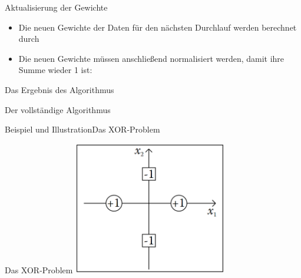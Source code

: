 \documentclass[hyperref={bookmarks=false},11pt,dvipsnames]{beamer}
\begin{document}
\begin{frame}[t]{Aktualisierung der Gewichte}
	\begin{itemize}
		\item <1-> Die neuen Gewichte der Daten für den nächsten Durchlauf werden berechnet durch
		      
		\item <2-> Die neuen Gewichte müssen anschließend normalisiert werden, damit ihre Summe wieder 1 ist:
		      
	\end{itemize}
\end{frame}

\begin{frame}[t]{Das Ergebnis des Algorithmus}
	
\end{frame}

\begin{frame}[allowframebreaks]{Der vollständige Algorithmus}
	\begin{scriptsize}
		
		
	\end{scriptsize}
\end{frame}

\begin{frame}{Beispiel und Illustration}{Das XOR-Problem}
	\begin{scriptsize}
		
		
	\end{scriptsize}
\end{frame}

\begin{frame}{Das XOR-Problem}
	\centering
	\includegraphics[width=0.5\textwidth]{../Ausarbeitung/figures/XOR-Problem.png}
\end{frame}
\end{document}
